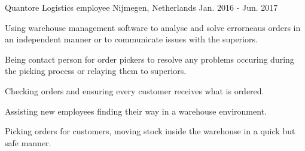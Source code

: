 \begin{cventries}
\cventry
    {Quantore} %
    {Logistics employee} %
    {Nijmegen, Netherlands} %
    {Jan. 2016 - Jun. 2017} %
    {
      \begin{cvitems}
        \item {Using warehouse management software to analyse and solve errorneaus orders in an independent manner or to communicate issues with the superiors.}
        \item {Being contact person for order pickers to resolve any problems occuring during the picking process or relaying them to superiors.}
        \item {Checking orders and ensuring every customer receives what is ordered.}
        \item {Assisting new employees finding their way in a warehouse environment.}
        \item {Picking orders for customers, moving stock inside the warehouse in a quick but safe manner.}
      \end{cvitems}
    }
\end{cventries}
